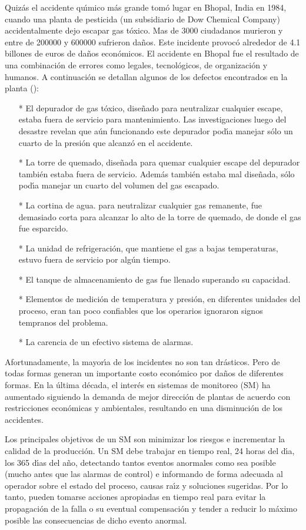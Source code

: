 Quiz{\'a}s el accidente qu{\'\i}mico m{\'a}s grande tom{\'o} lugar en Bhopal, India en 1984, cuando una planta de pesticida
(un subsidiario de Dow Chemical Company) accidentalmente dejo escapar gas t{\'o}xico. Mas de 3000 ciudadanos
murieron y entre de 200000 y 600000 sufrieron da{\~n}os. Este incidente provoc{\'o} alrededor de 4.1 billones de
euros de da{\~n}os econ{\'o}micos. El accidente en Bhopal fue el resultado de una combinaci{\'o}n de errores como
legales, tecnol{\'o}gicos, de organizaci{\'o}n y humanos. A continuaci{\'o}n se detallan algunos de los defectos
encontrados en la planta (\cite{Me:05,CEFIC}):
\begin{itemize}
    \item[*] El depurador de gas t{\'o}xico, dise{\~n}ado para neutralizar cualquier escape, estaba fuera de
    servicio para mantenimiento. Las investigaciones luego del desastre revelan que a{\'u}n funcionando este
    depurador pod{\'\i}a manejar s{\'o}lo un cuarto de la presi{\'o}n que alcanz{\'o} en el accidente.
    \item[*] La torre de quemado, dise{\~n}ada para quemar cualquier escape del depurador tambi{\'e}n estaba fuera
    de servicio. Adem{\'a}s tambi{\'e}n estaba mal dise{\~n}ada, s{\'o}lo pod{\'\i}a manejar un cuarto del volumen del gas
    escapado.
    \item[*] La cortina de agua. para neutralizar cualquier gas remanente, fue demasiado corta para alcanzar
    lo alto de la torre de quemado, de donde el gas fue esparcido.
    \item[*] La unidad de refrigeraci{\'o}n, que mantiene el gas a bajas temperaturas, estuvo fuera de servicio
    por alg{\'u}n tiempo.
    \item[*] El tanque de almacenamiento de gas fue llenado superando su capacidad.
    \item[*] Elementos de medici{\'o}n de temperatura y presi{\'o}n, en diferentes unidades del proceso, eran tan
    poco confiables que los operarios ignoraron signos tempranos del problema.
    \item[*] La carencia de un efectivo sistema de alarmas.
\end{itemize}

Afortunadamente, la mayor{\'\i}a de los incidentes no son tan dr{\'a}sticos. Pero de todas formas generan un
importante costo econ{\'o}mico por da{\~n}os de diferentes formas. En la {\'u}ltima d{\'e}cada, el inter{\'e}s en sistemas de
monitoreo (SM) ha aumentado siguiendo la demanda de mejor direcci{\'o}n de plantas de acuerdo con restricciones
econ{\'o}micas y ambientales, resultando en una disminuci{\'o}n de los accidentes.

Los principales objetivos de un SM son minimizar los riesgos e incrementar la calidad de la producci{\'o}n. Un
SM debe trabajar en tiempo real, 24 horas del d{\'\i}a, los 365 d{\'\i}as del a{\~n}o, detectando tantos eventos anormales
como sea posible (mucho antes que las alarmas de control) e informando de forma adecuada al operador sobre
el estado del proceso, causas ra{\'\i}z y soluciones sugeridas. Por lo tanto, pueden tomarse acciones apropiadas
en tiempo real para evitar la propagaci{\'o}n de la falla o su eventual compensaci{\'o}n y tender a reducir lo
m{\'a}ximo posible las consecuencias de dicho evento anormal.
